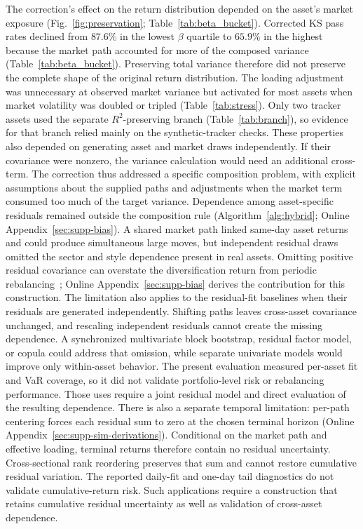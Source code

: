 The correction's effect on the return distribution depended on the
asset's market exposure (Fig.~\ref{fig:preservation};
Table~\ref{tab:beta_bucket}). Corrected KS pass rates declined from
$87.6\%$ in the lowest $\beta$ quartile to $65.9\%$ in the highest
because the market path accounted for more of the composed variance
(Table~\ref{tab:beta_bucket}). Preserving total variance therefore
did not preserve the complete shape of the original return
distribution. The loading adjustment was unnecessary at observed
market variance but activated for most assets when market volatility
was doubled or tripled (Table~\ref{tab:stress}). Only two tracker
assets used the separate $R^2$-preserving branch
(Table~\ref{tab:branch}), so evidence for that branch relied mainly
on the synthetic-tracker checks. These properties also depended on
generating asset and market draws independently. If their covariance
were nonzero, the variance calculation would need an additional
cross-term. The correction thus addressed a specific composition
problem, with explicit assumptions about the supplied paths and
adjustments when the market term consumed too much of the target
variance.
Dependence among asset-specific residuals remained outside the
composition rule (Algorithm~\ref{alg:hybrid}; Online
Appendix~\ref{sec:supp-bias}). A shared market path linked same-day asset returns and
could produce simultaneous large moves, but independent residual
draws omitted the sector and style dependence present in real assets.
Omitting positive residual covariance can overstate the diversification
return from periodic rebalancing~\cite{boothFama1992,
boucheyNemtchinovWong2015, markowitz1976longRun}; Online
Appendix~\ref{sec:supp-bias} derives the contribution for this
construction. The limitation also applies to the residual-fit
baselines when their residuals are generated independently. Shifting
paths leaves cross-asset covariance unchanged, and rescaling
independent residuals cannot create the missing dependence. A
synchronized multivariate block bootstrap, residual factor model, or
copula could address that omission, while separate univariate models
would improve only within-asset behavior. The present evaluation
measured per-asset fit and VaR coverage, so it did not validate
portfolio-level risk or rebalancing performance. Those uses require a
joint residual model and direct evaluation of the resulting dependence.
There is also a separate temporal limitation: per-path centering
forces each residual sum to zero at the chosen terminal horizon
(Online Appendix~\ref{sec:supp-sim-derivations}). Conditional on the
market path and effective loading, terminal returns therefore contain
no residual uncertainty. Cross-sectional rank reordering preserves
that sum and cannot restore cumulative residual variation. The
reported daily-fit and one-day tail diagnostics do not validate
cumulative-return risk. Such applications require a construction that
retains cumulative residual uncertainty as well as validation of
cross-asset dependence.
